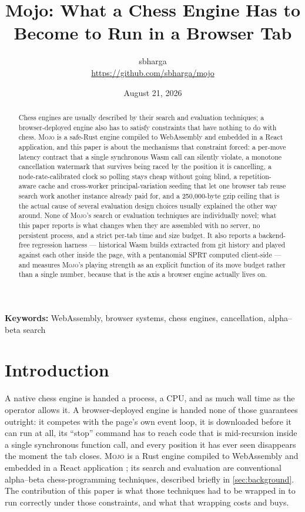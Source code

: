\documentclass[10pt,twocolumn]{article}
\title{\vspace{-1.2em}\textbf{Mojo: What a Chess Engine Has to Become to Run in a Browser Tab}}
\author{sbharga\\[-0.2em]
  \small\url{https://github.com/sbharga/mojo}}
\date{August 21, 2026}
\newcommand{\engine}{\textsc{Mojo}}
\begin{document}
\maketitle
\vspace{-1.1em}

\begin{abstract}
Chess engines are usually described by their search and evaluation
techniques; a browser-deployed engine also has to satisfy constraints that
have nothing to do with chess.  \engine{} is a safe-Rust engine compiled to
WebAssembly and embedded in a React application, and this paper is about the
mechanisms that constraint forced: a per-move latency contract that a single
synchronous Wasm call can silently violate, a monotone cancellation
watermark that survives being raced by the position it is cancelling, a
node-rate-calibrated clock so polling stays cheap without going blind, a
repetition-aware cache and cross-worker principal-variation seeding that let
one browser tab reuse search work another instance already paid for, and a
250,000-byte gzip ceiling that is the actual cause of several evaluation
design choices usually explained the other way around.  None of \engine's
search or evaluation techniques are individually novel; what this paper
reports is what changes when they are assembled with no server, no
persistent process, and a strict per-tab time and size budget.  It also
reports a backend-free regression harness --- historical Wasm builds
extracted from git history and played against each other inside the page,
with a pentanomial SPRT computed client-side --- and measures \engine's
playing strength as an explicit function of its move budget rather than a
single number, because that is the axis a browser engine actually lives on.
\end{abstract}

\noindent\textbf{Keywords:} WebAssembly, browser systems, chess engines,
cancellation, alpha--beta search

\section{Introduction}

A native chess engine is handed a process, a CPU, and as much wall time as
the operator allows it.  A browser-deployed engine is handed none of those
guarantees outright: it competes with the page's own event loop, it is
downloaded before it can run at all, its ``stop'' command has to reach code
that is mid-recursion inside a single synchronous function call, and every
position it has ever seen disappears the moment the tab closes.  \engine{}
is a Rust engine compiled to WebAssembly \citep{haas2017wasm} and embedded in
a React application \citep{mojo2026software}; its search and evaluation are
conventional
alpha--beta chess-programming techniques, described briefly in
\cref{sec:background}.  The contribution of this paper is what those
techniques had to be wrapped in to run correctly under those constraints,
and what that wrapping costs and buys.
\end{document}
